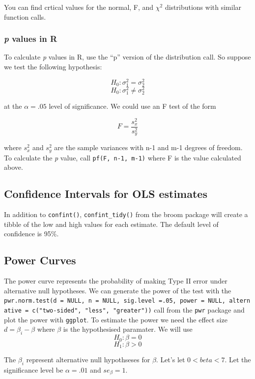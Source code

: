 \documentclass[]{book}
\begin{document}
You can find crtical values for the normal, F, and \(\chi^2\) distributions with similar function calls.

\hypertarget{p-values-in-r}{%
\subsubsection{\texorpdfstring{\emph{p} values in R}{p values in R}}\label{p-values-in-r}}

To calculate \emph{p} values in R, use the ``p'' version of the distribution call. So suppose we test the following hypothesis:

\[H_0:\sigma_1^2=\sigma_2^2\]
\[H_0:\sigma_1^2\ne\sigma_2^2\]

at the \(\alpha=.05\) level of significance. We could use an F test of the form

\[F=\frac{s_x^2}{s_y^2}\]

where \(s_x^2\) and \(s_y^2\) are the sample variances with n-1 and m-1 degrees of freedom. To calculate the \emph{p} value, call \texttt{pf(F,\ n-1,\ m-1)} where F is the value calculated above.

\hypertarget{confidence-intervals-for-ols-estimates}{%
\subsection{Confidence Intervals for OLS estimates}\label{confidence-intervals-for-ols-estimates}}

In addition to \texttt{confint()}, \texttt{confint\_tidy()} from the broom package will create a tibble of the low and high values for each estimate. The default level of confidence is 95\%.

\hypertarget{power-curves}{%
\subsection{Power Curves}\label{power-curves}}

The power curve represents the probability of making Type II error under alternative null hypotheses. We can generate the power of the test with the \texttt{pwr.norm.test(d\ =\ NULL,\ n\ =\ NULL,\ sig.level\ =.05,\ power\ =\ NULL,\ alternative\ =\ c("two-sided",\ "less",\ "greater"))} call from the \texttt{pwr} package and plot the power with \texttt{ggplot}. To estimate the power we need the effect size \(d = \beta_i - \beta\) where \(\beta\) is the hypothesised paramater. We will use
\[H_0: \beta = 0\]
\[H_1: \beta > 0\]

The \(\beta_i\) represent alternative null hypothseses for \(\beta\). Let's let \(0 < beta < 7\). Let the significance level be \(\alpha=.01\) and \(se_{\beta} = 1\).
\end{document}
